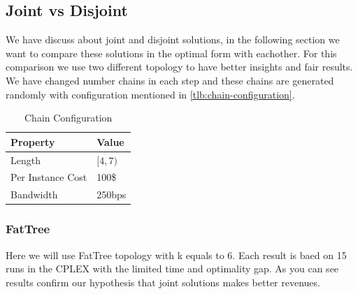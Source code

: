 \subsection{Joint vs Disjoint}\label{sec:joint-vs-disjoint}
We have discuss about joint and disjoint solutions, in the following section we want to compare these solutions in the optimal form with eachother.
For this comparison we use two different topology to have better insights and fair results.
We have changed number chains in each step and these chains are generated randomly with configuration mentioned in \ref{tlb:chain-configuration}.

\begin{table}[H]
  \caption{Chain Configuration}
  \label{tbl:chain-configuration}
  \centering
  \begin{tabular}{ll}
    \toprule
    Property & Value \\
    \midrule
    Length & $[4,7)$ \\
    Per Instance Cost & 100\$ \\
    Bandwidth & 250bps \\
  \end{tabular}
\end{table}

\subsubsection{FatTree}
Here we will use FatTree topology with k equals to 6. Each result is baed on 15 runs in the CPLEX with the limited time and optimality gap.
As you can see results confirm our hypothesis that joint solutions makes better revenues.

